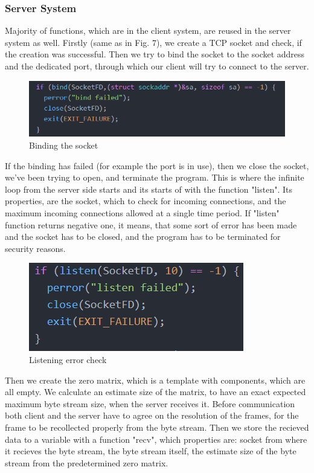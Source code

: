 \documentclass[conference]{IEEEtran}
\begin{document}
\subsubsection{Server System}
Majority of functions, which are in the client system, are reused in the server system as well. Firstly (same as in Fig. 7), we create a TCP socket and check, if the creation was successful. Then we try to bind the socket to the socket address and the dedicated port, through which our client will try to connect to the server.
\begin{figure}[h!]
	\includegraphics[width=\linewidth]{ServerCodeExample1.png}
	\caption{Binding the socket}
	\label{fig:SCE1}
\end{figure}
 If the binding has failed (for example the port is in use), then we close the socket, we've been trying to open, and terminate the program.
\newline
This is where the infinite loop from the server side starts and its starts of with the function "listen". Its properties, are the socket, which to check for incoming connections, and the maximum incoming connections allowed at a single time period. If "listen" function returns negative one, it means, that some sort of error has been made and the socket has to be closed, and the program has to be terminated for security reasons.
\begin{figure}[h!]
	\includegraphics[width=\linewidth]{ServerCodeExample2.png}
	\caption{Listening error check}
	\label{fig:SCE2}
\end{figure}
\newline
Then we create the zero matrix, which is a template with components, which are all empty. We calculate an estimate size of the matrix, to have an exact expected maximum byte stream size, when the server receives it. Before communication both client and the server have to agree on the resolution of the frames, for the frame to be recollected properly from the byte stream. Then we store the recieved data to a variable with a function "recv", which properties are: socket from where it recieves the byte stream, the byte stream itself, the estimate size of the byte stream from the predetermined zero matrix.
\end{document}

